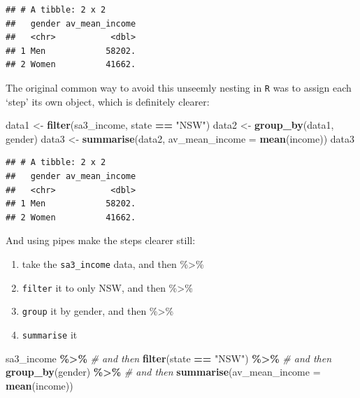 \documentclass[
]{book}
\newenvironment{Shaded}{\begin{snugshade}}{\end{snugshade}}
\newcommand{\CommentTok}[1]{\textcolor[rgb]{0.56,0.35,0.01}{\textit{#1}}}
\newcommand{\DataTypeTok}[1]{\textcolor[rgb]{0.13,0.29,0.53}{#1}}
\newcommand{\KeywordTok}[1]{\textcolor[rgb]{0.13,0.29,0.53}{\textbf{#1}}}
\newcommand{\NormalTok}[1]{#1}
\newcommand{\OperatorTok}[1]{\textcolor[rgb]{0.81,0.36,0.00}{\textbf{#1}}}
\newcommand{\StringTok}[1]{\textcolor[rgb]{0.31,0.60,0.02}{#1}}
\providecommand{\tightlist}{%
  \setlength{\itemsep}{0pt}\setlength{\parskip}{0pt}}
\begin{document}
\begin{verbatim}
## # A tibble: 2 x 2
##   gender av_mean_income
##   <chr>           <dbl>
## 1 Men            58202.
## 2 Women          41662.
\end{verbatim}

The original common way to avoid this unseemly nesting in \texttt{R} was to assign each `step' its own object, which is definitely clearer:

\begin{Shaded}
\begin{Highlighting}[]
\NormalTok{data1 \textless{}{-}}\StringTok{ }\KeywordTok{filter}\NormalTok{(sa3\_income, state }\OperatorTok{==}\StringTok{ "NSW"}\NormalTok{)}
\NormalTok{data2 \textless{}{-}}\StringTok{ }\KeywordTok{group\_by}\NormalTok{(data1, gender)}
\NormalTok{data3 \textless{}{-}}\StringTok{ }\KeywordTok{summarise}\NormalTok{(data2, }\DataTypeTok{av\_mean\_income =} \KeywordTok{mean}\NormalTok{(income))}
\NormalTok{data3}
\end{Highlighting}
\end{Shaded}

\begin{verbatim}
## # A tibble: 2 x 2
##   gender av_mean_income
##   <chr>           <dbl>
## 1 Men            58202.
## 2 Women          41662.
\end{verbatim}

And using pipes make the steps clearer still:

\begin{enumerate}
\def\labelenumi{\arabic{enumi}.}
\tightlist
\item
  take the \texttt{sa3\_income} data, and then \%\textgreater\%
\item
  \texttt{filter} it to only NSW, and then \%\textgreater\%
\item
  \texttt{group} it by gender, and then \%\textgreater\%
\item
  \texttt{summarise} it
\end{enumerate}

\begin{Shaded}
\begin{Highlighting}[]
\NormalTok{sa3\_income }\OperatorTok{\%\textgreater{}\%}\StringTok{  }\CommentTok{\# and then}
\StringTok{  }\KeywordTok{filter}\NormalTok{(state }\OperatorTok{==}\StringTok{ "NSW"}\NormalTok{) }\OperatorTok{\%\textgreater{}\%}\StringTok{ }\CommentTok{\# and then }
\StringTok{  }\KeywordTok{group\_by}\NormalTok{(gender) }\OperatorTok{\%\textgreater{}\%}\StringTok{ }\CommentTok{\# and then}
\StringTok{  }\KeywordTok{summarise}\NormalTok{(}\DataTypeTok{av\_mean\_income =} \KeywordTok{mean}\NormalTok{(income))}
\end{Highlighting}
\end{Shaded}
\end{document}

